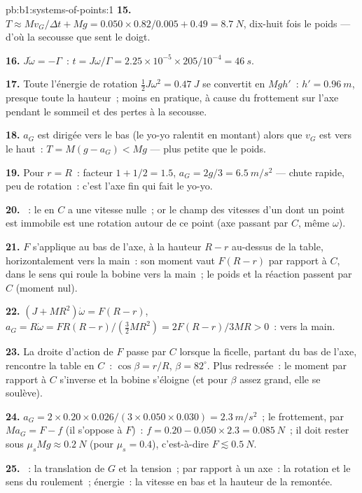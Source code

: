 \begin{solution}{pb:b1:systems-of-points:1}
\textbf{15.} $T \approx Mv_G/\Delta t + Mg = 0.050 \times 0.82/0.005 + 0.49 =
\qty{8.7}{N}$, dix-huit fois le poids --- d'où la secousse que sent le doigt.

\textbf{16.} $J\dot\omega = -\Gamma$~: $t = J\omega/\Gamma = 2.25\times10^{-5} \times
205/10^{-4} = \qty{46}{s}$.

\textbf{17.} Toute l'énergie de rotation $\tfrac12 J\omega^2 = \qty{0.47}{J}$
se convertit en $Mgh'$~: $h' = \qty{0.96}{m}$, presque toute la hauteur~;
moins en pratique, à cause du frottement sur l'axe pendant le sommeil et
des pertes à la secousse.

\textbf{18.} $a_G$ est dirigée vers le bas (le yo-yo ralentit en montant)
alors que $v_G$ est vers le haut~: $T = M(g - a_G) < Mg$ --- plus petite
que le poids.

\textbf{19.} Pour $r = R$~: facteur $1 + 1/2 = 1.5$, $a_G = 2g/3 = \qty{6.5}{m/s^2}$
--- chute rapide, peu de rotation~: c'est l'axe fin qui fait le yo-yo.

\textbf{20.} ~: le  en $C$ a une
vitesse nulle~; or le champ des vitesses d'un  dont un point est
immobile est une rotation autour de ce point (axe passant par $C$, même $\omega$).

\textbf{21.} $F$ s'applique au bas de l'axe, à la hauteur $R - r$ au-dessus
de la table, horizontalement vers la main~: son moment vaut $F(R - r)$
par rapport à $C$, dans le sens qui roule la bobine vers la main~; le
poids et la réaction passent par $C$ (moment nul).

\textbf{22.} $(J + MR^2)\dot\omega = F(R - r)$, $a_G = R\dot\omega = FR(R - r)/
(\tfrac32 MR^2) = 2F(R - r)/3MR > 0$~: vers la main.

\textbf{23.} La droite d'action de $F$ passe par $C$ lorsque la ficelle,
partant du bas de l'axe, rencontre la table en $C$~: $\cos\beta = r/R$,
$\beta = 82^\circ$. Plus redressée~: le moment par rapport à $C$ s'inverse
et la bobine s'éloigne (et pour $\beta$ assez grand, elle se soulève).

\textbf{24.} $a_G = 2 \times 0.20 \times 0.026/(3 \times 0.050 \times 0.030) =
\qty{2.3}{m/s^2}$~; le frottement, par $Ma_G = F - f$ (il s'oppose à $F$)~:
$f = 0.20 - 0.050 \times 2.3 = \qty{0.085}{N}$~; il doit rester sous $\mu_sMg
\approx \qty{0.2}{N}$ (pour $\mu_s = 0.4$), c'est-à-dire $F \lesssim \qty{0.5}{N}$.

\textbf{25.} ~: la translation de $G$ et la tension~;
 par rapport à un axe~: la rotation et le sens du
roulement~; énergie~: la vitesse en bas et la hauteur de la remontée.
\end{solution}
